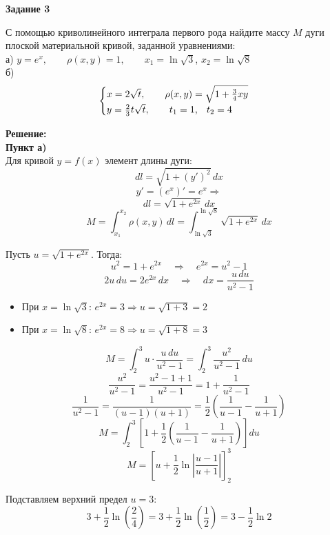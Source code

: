 \documentclass[12pt,fleqn]{article}
\begin{document}
\begin{flushleft}

    \textbf{Задание 3}

    С помощью криволинейного интеграла первого рода найдите массу $M$
    дуги плоской материальной кривой, заданной уравнениями: \\
    а) $y = e^x, \qquad \rho(x,y) = 1, \qquad x_1 = \ln\sqrt{3}$, \qquad $x_2 = \ln\sqrt{8}$ \\
    б)
    \[
    \begin{cases}
        x = 2\sqrt{t}, \qquad \rho(x,y) = \sqrt{1 + \frac{3}{4}xy} \\
        y = \frac{2}{3}t\sqrt{t}, \qquad t_1 = 1$, \; $t_2 = 4 \\
    \end{cases} 
    \]

    \textbf{Решение:} \\
    \textbf{Пункт а)} \\
    Для кривой $y = f(x)$ элемент длины дуги:
    \[ dl = \sqrt{1 + (y')^2} \, dx  \]
    \[ y' = (e^x)' = e^x  \Rightarrow \]
    \[ dl = \sqrt{1 + e^{2x}} \, dx \]
    \[ M = \int_{x_1}^{x_2} \rho(x,y) \, dl = \int_{\ln\sqrt{3}}^{\ln\sqrt{8}} \sqrt{1 + e^{2x}} \, dx \]

    Пусть $u = \sqrt{1 + e^{2x}}$. Тогда:
    \[ u^2 = 1 + e^{2x} \quad \Rightarrow \quad e^{2x} = u^2 - 1 \]
    \[ 2u \, du = 2e^{2x} \, dx \quad \Rightarrow \quad dx = \frac{u \, du}{u^2 - 1} \]

    \begin{itemize}
        \item При $x = \ln\sqrt{3}$: $e^{2x} = 3 \Rightarrow u = \sqrt{1 + 3} = 2$
        \item При $x = \ln\sqrt{8}$: $e^{2x} = 8 \Rightarrow u = \sqrt{1 + 8} = 3$
    \end{itemize}
    \[M = \int_2^3 u \cdot \frac{u \, du}{u^2 - 1} = \int_2^3 \frac{u^2}{u^2 - 1} \, du\]
    \[ \frac{u^2}{u^2 - 1} = \frac{u^2 - 1 + 1}{u^2 - 1} = 1 + \frac{1}{u^2 - 1} \]
    \[ \frac{1}{u^2 - 1} = \frac{1}{(u-1)(u+1)} = \frac{1}{2}\left(\frac{1}{u-1} - \frac{1}{u+1}\right)\]
    \[ M = \int_2^3 \left[1 + \frac{1}{2}\left(\frac{1}{u-1} - \frac{1}{u+1}\right)\right] du\]
    \[M = \left[u + \frac{1}{2}\ln\left|\frac{u-1}{u+1}\right|\right]_2^3 \]

    Подставляем верхний предел $u = 3$:
    \[3 + \frac{1}{2}\ln\left(\frac{2}{4}\right) = 3 + \frac{1}{2}\ln\left(\frac{1}{2}\right) = 3 - \frac{1}{2}\ln 2 \]


\end{flushleft}
\end{document}
